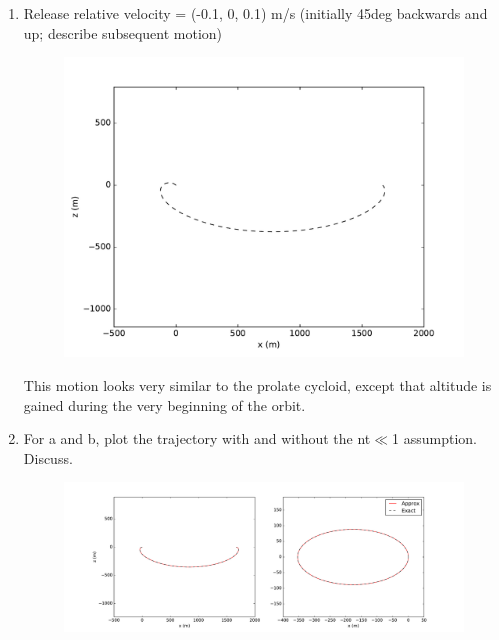 \documentclass[onecolumn,10pt]{jhwhw}
\begin{document}
\begin{enumerate}
\begin{figure}[h!]
\begin{center}
\end{center}
\end{figure}
\item Release relative velocity = (-0.1, 0, 0.1) m/s (initially 45deg backwards and up; describe subsequent motion)
\begin{figure}[h!]
\begin{center}
\includegraphics[height=0.3\textheight]{6c.pdf}
\end{center}
\vspace{-1.5em}
\end{figure}

This motion looks very similar to the prolate cycloid, except that altitude is gained during the very beginning of the orbit.
\item For a and b, plot the trajectory with and without the nt$\ll$1 assumption. Discuss.
\begin{figure}[h!]
\begin{center}
\includegraphics[width=1\textwidth]{6dboth.pdf}
\end{center}
\vspace{-1.5em}
\end{figure}


\end{enumerate}
\end{document}
